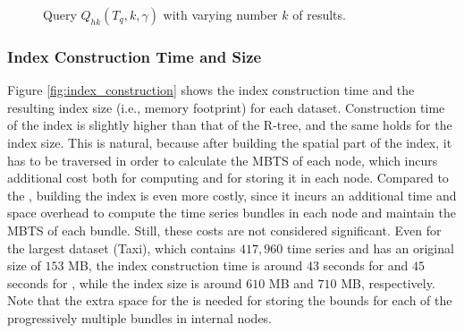 \begin{figure}[t]
	\centering
	\caption{Query $Q_{hk}(T_q, k, \gamma)$ with varying number $k$ of results.}
	\label{fig:query_qhk_k}
\end{figure}


\subsubsection{Index Construction Time and Size}

Figure \ref{fig:index_construction} shows the index construction time and the resulting index size (i.e., memory footprint) for each dataset. Construction time of the \tsr index is slightly higher than that of the R-tree, and the same holds for the index size. This is natural, because after building the spatial part of the index, it has to be traversed in order to calculate the MBTS of each node, which incurs additional cost both for computing and for storing it in each node. Compared to the \tsr, building the \ctsr index is even more costly, since it incurs an additional time and space overhead to compute the time series bundles in each node and maintain the MBTS of each bundle. Still, these costs are not considered significant. Even for the largest dataset (Taxi), which contains $417,960$ time series and has an original size of $153$ MB, the index construction time is around $43$ seconds for \tsr and $45$ seconds for \ctsr, while the index size is around $610$ MB and $710$ MB, respectively. Note that the extra space for the \ctsr is needed for storing the bounds for each of the progressively multiple bundles in internal nodes.

